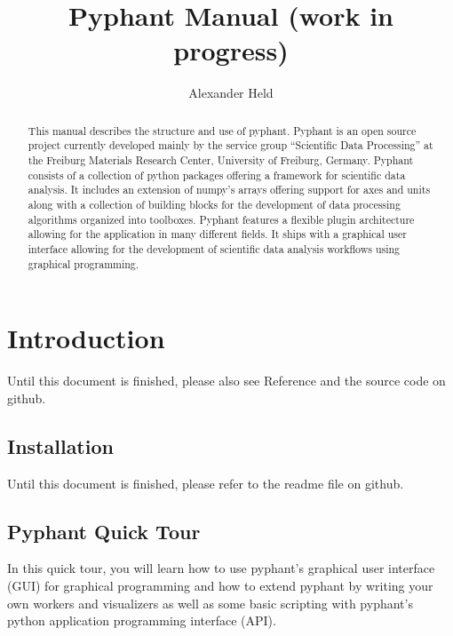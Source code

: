 \documentclass[a4paper]{article}
\begin{document}
\title{Pyphant Manual (work in progress)}
\author{Alexander Held}

\maketitle

\date{}

\begin{abstract}
  This manual describes the structure and use of
  pyphant. Pyphant is an open source project
  currently developed mainly by the service group ``Scientific Data
  Processing'' at the Freiburg Materials Research Center, University
  of Freiburg, Germany. Pyphant consists of a collection of python
  packages offering a framework for scientific data analysis. It
  includes an extension of numpy's arrays offering
  support for axes and units along with a collection of building
  blocks for the development of data processing algorithms organized
  into toolboxes. Pyphant features a flexible plugin architecture
  allowing for the application in many different fields. It ships with
  a graphical user interface allowing for the development of
  scientific data analysis workflows using graphical programming.
\end{abstract}

\tableofcontents

\section{Introduction}
\label{sec:introduction}

Until this document is finished, please also see
Reference\cite{pyphant} and the source code on
github\cite{pyphanturl}.

\subsection{Installation}
\label{sec:introduction_installation}

Until this document is finished, please refer to the readme file on
github\cite{pyphanturl}.

\subsection{Pyphant Quick Tour}
\label{sec:introduction_a_quick_tour}

In this quick tour, you will learn how to use pyphant's graphical user
interface (GUI) for graphical programming and how to extend pyphant by
writing your own workers and visualizers as well as some basic
scripting with pyphant's python application programming interface
(API).
\end{document}
